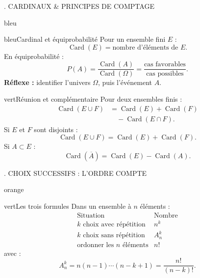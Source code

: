 \documentclass[11pt,a4paper]{article}
\newcommand{\tagcol}[2]{%
\begin{tcolorbox}[
    enhanced,
    colback=#1!11,
    colframe=#1!45!black,
    boxrule=0.42pt,
    arc=2mm,
    left=1mm,right=1mm,top=0.45mm,bottom=0.45mm,
    before skip=0mm,
    after skip=0.85mm,
    fontupper=\bfseries\scriptsize,
    colupper=#1!55!black
]
\centering #2
\end{tcolorbox}}
\begin{document}
\begin{landscape}
\noindent
\begin{minipage}[t]{0.318\linewidth}
\tagcol{bleu}{5. CARDINAUX \& PRINCIPES DE COMPTAGE}
\begin{panel}{bleu}

\begin{fichebox}{bleu}{Cardinal et équiprobabilité}
Pour un ensemble fini $E$ :
\[
\operatorname{Card}(E)=\text{nombre d'éléments de }E.
\]
En équiprobabilité :
\[
P(A)=\frac{\operatorname{Card}(A)}{\operatorname{Card}(\Omega)}
=\frac{\text{cas favorables}}{\text{cas possibles}}.
\]
\textbf{Réflexe :} identifier l'univers $\Omega$, puis l'événement $A$.
\end{fichebox}

\begin{fichebox}{vert}{Réunion et complémentaire}
Pour deux ensembles finis :
\[
\begin{aligned}
\operatorname{Card}(E\cup F)
&=\operatorname{Card}(E)+\operatorname{Card}(F)\\[-0.2em]
&\quad-\operatorname{Card}(E\cap F).
\end{aligned}
\]
Si $E$ et $F$ sont disjoints :
\[
\operatorname{Card}(E\cup F)=\operatorname{Card}(E)+\operatorname{Card}(F).
\]
Si $A\subset E$ :
\[
\operatorname{Card}(\overline A)=\operatorname{Card}(E)-\operatorname{Card}(A).
\]
\end{fichebox}

\end{panel}
\end{minipage}
\hfill
\begin{minipage}[t]{0.318\linewidth}
\tagcol{orange}{6. CHOIX SUCCESSIFS : L'ORDRE COMPTE}
\begin{panel}{orange}

\begin{fichebox}{vert}{Les trois formules}
Dans un ensemble à $n$ éléments :
\[
\begin{array}{c|c}
\text{Situation} & \text{Nombre}\\
\hline
k\text{ choix avec répétition} & n^k\\[0.2em]
k\text{ choix sans répétition} & A_n^k\\[0.2em]
\text{ordonner les }n\text{ éléments} & n!
\end{array}
\]
avec :
\[
A_n^k=n(n-1)\cdots(n-k+1)=\frac{n!}{(n-k)!}.
\]
\end{fichebox}


\end{panel}
\end{minipage}
\end{landscape}
\end{document}
